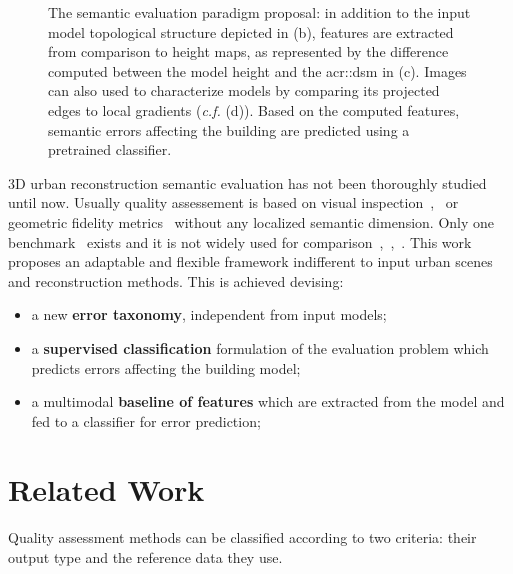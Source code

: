 \documentclass[runningheads]{llncs}
\begin{document}
	\begin{figure}
        \begin{center}
            
            \caption{\label{fig::pipeline} The semantic evaluation paradigm proposal: in addition to the input model topological structure depicted in (b), features are extracted from comparison to height maps, as represented by the difference computed between the model height and the \acrlong{acr::dsm} in (c). Images can also used to characterize models by comparing its projected edges to local gradients (\textit{c.f.} (d)). Based on the computed features, semantic errors affecting the building are predicted using a pretrained classifier.}
        \end{center}
    \end{figure}
     3D urban reconstruction semantic evaluation has not been thoroughly studied until now. Usually quality assessement is based on visual inspection~\cite{Durupt2006},~\cite{MacayMoreia2013} or geometric fidelity metrics~\cite{Kaartinen2005} without any localized semantic dimension. Only one benchmark~\cite{rottensteiner2014results} exists and it is not widely used for comparison~\cite{li2016boxfitting},~\cite{nan2017polyfit},~\cite{nguatem2017modeling}. This work proposes an adaptable and flexible framework indifferent to input urban scenes and reconstruction methods. This is achieved devising:
    \begin{itemize}
        \item a new \textbf{error taxonomy}, independent from input models;
        \item a \textbf{supervised classification} formulation of the evaluation problem which predicts errors affecting the building model;
        \item a multimodal \textbf{baseline of features} which are extracted from the model and fed to a classifier for error prediction;
    \end{itemize}

\section{Related Work}

Quality assessment methods can be classified according to two criteria: their output type and the reference data they use.
\end{document}

